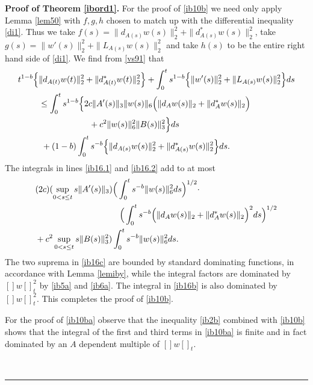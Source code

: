 \documentclass[12pt]{article}
\newenvironment{proof}[1][Proof]{\textbf{#1.} }{\ \rule{0.5em}{0.5em}}
\def \nn{[]}
\def \eref{\eqref}
\numberwithin{equation}{section}
\begin{document}
\bigskip
\noindent
\begin{proof}[Proof of Theorem \ref{ibord1}]
For the proof of \eref{ib10b} we need only apply  Lemma \ref{lem50}   with 
 $f, g, h$ chosen to match up with the differential inequality \eref{di1}. 
 Thus we take 
$f(s) =  \| d_{A(s)} w(s)\|_2^2 +\| d_{A(s)}^* w(s)\|_2^2$, 
take $g(s) = \|w'(s) \|_2^2 + \| L_{A(s)} w(s)\|_2^2$
 and take $h(s)$ to be the entire right hand side of \eref{di1}.
 We find from \eref{vs91} that  
\begin{align}
t^{1-b}\Big\{& \| d_{A(t)} w(t)\|_2^2 +\| d_{A(t)}^* w(t)\|_2^2 \Big\}  
         + \int_0^t s^{1-b} \Big\{ \|w'(s) \|_2^2 + \| L_{A(s)} w(s)\|_2^2 \Big\} ds \notag\\
&\le \int_0^t  s^{1-b}
\Big\{ 2c  \|A'(s)\|_3 \|w(s)\|_6 \Big(\| d_A w(s)\|_2 + \| d_A^* w(s)\|_2\Big) \label{ib16.1}\\
 &\qquad \qquad \qquad+   c^2 \|w(s)\|_6^2 \| B(s)\|_3^2 \Big\}ds \label{ib16.2} \\
 &\ +(1-b)\int_0^t s^{-b}\Big\{ \| d_{A(s)} w(s) \|_2^2 
                    + \| d_{A(s)}^* w(s) \|_2^2\Big\} ds.                                  \label{ib16b}
\end{align}
The integrals in lines \eref{ib16.1} and \eref{ib16.2} add to at most
\begin{align}
&(2c)(\sup_{0< s \le t} s \|A'(s)\|_3)\Big(\int_0^t s^{-b} \|w(s)\|_6^2 ds \Big)^{1/2} \cdot      \notag\\
&\qquad\qquad\qquad\qquad\qquad\Big(\int_0^t s^{-b} \Big(\| d_A w(s)\|_2 
                                     + \| d_A^* w(s)\|_2\Big)^2 ds \Big)^{1/2}                               \notag\\
&+ c^2 \sup_{0< s\le t} s \|B(s)\|_3^2 ) \int_0^t s^{-b} \|w(s)\|_6^2 ds.                      \label{ib16c}
\end{align}
The two suprema in \eref{ib16c} are bounded  by standard dominating functions, in accordance
 with Lemma \ref{lemiby}, while the integral factors  are 
 dominated by $\nn w \nn_t^2$ by \eref{ib5a} and \eref{ib6a}. 
 The integral in \eref{ib16b} is also dominated by $\nn w \nn_t^2$.
 This completes  the proof of \eref{ib10b}.


   For the proof of \eref{ib10ba} observe that the inequality \eref{ib2b} combined with 
   \eref{ib10b} shows that the integral of the first  and third  terms in \eref{ib10ba}
    is finite and in fact    dominated by an $A$ dependent multiple of $\nn w\nn_t$.  
  

\end{proof}
\end{document}
